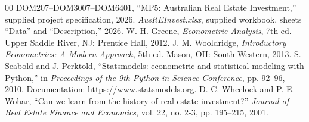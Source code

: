 \documentclass[conference]{IEEEtran}
\begin{document}
\begin{thebibliography}{00}
 DOM207--DOM3007--DOM6401, ``MP5: Australian Real Estate Investment,'' supplied project specification, 2026.
 \textit{AusREInvest.xlsx}, supplied workbook, sheets ``Data'' and ``Description,'' 2026.
 W. H. Greene, \textit{Econometric Analysis}, 7th ed. Upper Saddle River, NJ: Prentice Hall, 2012.
 J. M. Wooldridge, \textit{Introductory Econometrics: A Modern Approach}, 5th ed. Mason, OH: South-Western, 2013.
 S. Seabold and J. Perktold, ``Statsmodels: econometric and statistical modeling with Python,'' in \textit{Proceedings of the 9th Python in Science Conference}, pp. 92--96, 2010. Documentation: \url{https://www.statsmodels.org}.
 D. C. Wheelock and P. E. Wohar, ``Can we learn from the history of real estate investment?'' \textit{Journal of Real Estate Finance and Economics}, vol. 22, no. 2-3, pp. 195--215, 2001.
\end{thebibliography}
\end{document}
